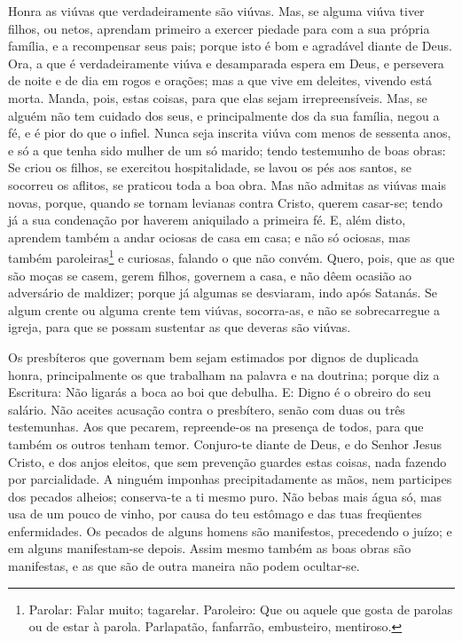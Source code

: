 Honra as viúvas que verdadeiramente são viúvas. Mas, se alguma
viúva tiver filhos, ou netos, aprendam primeiro a exercer piedade
para com a sua própria família, e a recompensar seus pais; porque
isto é bom e agradável diante de Deus. Ora, a que é
verdadeiramente viúva e desamparada espera em Deus, e persevera de
noite e de dia em rogos e orações; mas a que vive em deleites,
vivendo está morta. Manda, pois, estas coisas, para que elas
sejam irrepreensíveis. Mas, se alguém não tem cuidado dos seus,
e principalmente dos da sua família, negou a fé, e é pior do que o
infiel. Nunca seja inscrita viúva com menos de sessenta anos, e
só a que tenha sido mulher de um só marido; tendo testemunho
de boas obras: Se criou os filhos, se exercitou hospitalidade, se
lavou os pés aos santos, se socorreu os aflitos, se praticou toda a
boa obra. Mas não admitas as viúvas mais novas, porque,
quando se tornam levianas contra Cristo, querem casar-se;
tendo já a sua condenação por haverem aniquilado a primeira
fé. E, além disto, aprendem também a andar ociosas de casa em
casa; e não só ociosas, mas também paroleiras\footnote{Parolar:
Falar muito; tagarelar. Paroleiro: Que ou aquele que gosta de
parolas ou de estar à parola. Parlapatão, fanfarrão, embusteiro,
mentiroso.} e curiosas, falando o que não convém. Quero,
pois, que as que são moças se casem, gerem filhos, governem a casa,
e não dêem ocasião ao adversário de maldizer; porque já
algumas se desviaram, indo após Satanás. Se algum crente ou
alguma crente tem viúvas, socorra-as, e não se sobrecarregue a
igreja, para que se possam sustentar as que deveras são viúvas.

Os presbíteros que governam bem sejam estimados por dignos de
duplicada honra, principalmente os que trabalham na palavra e na
doutrina; porque diz a Escritura: Não ligarás a boca ao boi
que debulha. E: Digno é o obreiro do seu salário. Não aceites
acusação contra o presbítero, senão com duas ou três testemunhas.
Aos que pecarem, repreende-os na presença de todos, para que
também os outros tenham temor. Conjuro-te diante de Deus, e
do Senhor Jesus Cristo, e dos anjos eleitos, que sem prevenção
guardes estas coisas, nada fazendo por parcialidade. A
ninguém imponhas precipitadamente as mãos, nem participes dos
pecados alheios; conserva-te a ti mesmo puro. Não bebas mais
água só, mas usa de um pouco de vinho, por causa do teu estômago e
das tuas freqüentes enfermidades. Os pecados de alguns homens
são manifestos, precedendo o juízo; e em alguns manifestam-se
depois. Assim mesmo também as boas obras são manifestas, e as
que são de outra maneira não podem ocultar-se.

